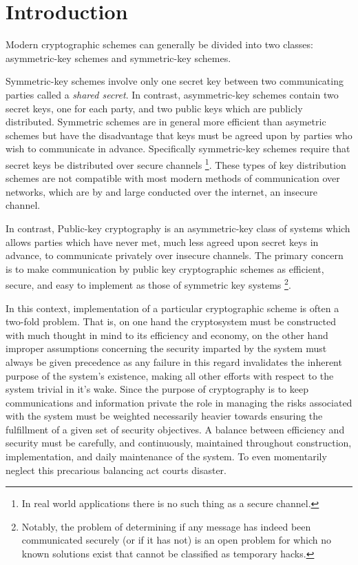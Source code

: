 \section{Introduction}

Modern cryptographic schemes can generally be divided into two classes: asymmetric-key schemes and symmetric-key schemes. 

Symmetric-key schemes involve only one secret key between two communicating parties called a \emph{shared secret}. In contrast, asymmetric-key schemes contain two secret keys, one for each party, and two public keys which are publicly distributed.
Symmetric schemes are in general more efficient than asymetric schemes but have the disadvantage that keys must be agreed upon by parties who wish to communicate in advance. Specifically symmetric-key schemes require that secret keys be distributed over secure channels \footnote{In real world applications there is no such thing as a secure channel.}. These types of key distribution schemes are not compatible with most modern methods of communication over networks, which are by and large conducted over the internet, an insecure channel.


In contrast, Public-key cryptography is an asymmetric-key class of systems which allows parties which have never met, much less agreed upon secret keys in advance, to communicate privately over insecure channels. The primary concern is to make communication by public key cryptographic schemes as efficient, secure, and easy to implement as those of symmetric key systems \footnote{Notably, the problem of determining if any message has indeed been communicated securely (or if it has not) is an open problem for which no known solutions exist that cannot be classified as temporary hacks.}.


In this context, implementation of a particular cryptographic scheme is often a two-fold problem. That is, on one hand the cryptosystem must be constructed with much thought in mind to its efficiency and economy, on the other hand improper assumptions concerning the security imparted by the system must always be given precedence as any failure in this regard invalidates the inherent purpose of the system's existence, making all other efforts with respect to the system trivial in it's wake. Since the purpose of cryptography is to keep communications and information private the role in managing the risks associated with the system must be weighted necessarily heavier towards ensuring the fulfillment of a given set of security objectives. A balance between efficiency and security must be carefully, and continuously, maintained throughout construction, implementation, and daily maintenance of the system. To even momentarily neglect this precarious balancing act courts disaster. 